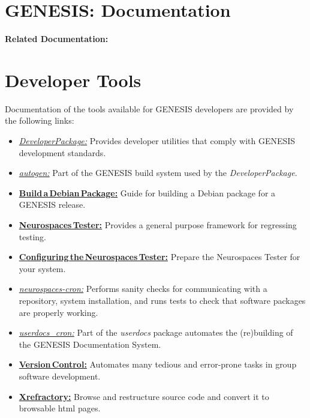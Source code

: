 \documentclass[12pt]{article}
\begin{document}
\section*{GENESIS: Documentation}

{\bf Related Documentation:}

\section*{Developer Tools}

Documentation of the tools available for GENESIS developers are provided by the following links:

\begin{itemize}
   \item[]\href{../developer-package/developer-package.tex}{\it DeveloperPackage:} Provides developer utilities that comply with GENESIS development standards.
   \item[]\href{../autogen/autogen.tex}{\it autogen:} Part of the GENESIS build system used by the {\it DeveloperPackage}.
   \item[]\href{../build-debian/build-debian.tex}{\bf Build\,a\,Debian\,Package:} Guide for building a Debian package for a GENESIS release.
   \item[]\href{../neurospaces-tester/neurospaces-tester.tex}{\bf Neurospaces\,Tester:} Provides a general purpose framework for regressing testing. 
   \item[]\href{../tester-configuration/tester-configuration.tex}{\bf Configuring\,the\,Neurospaces\,Tester:} Prepare the Neurospaces Tester for your system.
   \item[]\href{../neurospaces-cron/neurospaces-cron.tex}{\it neurospaces-cron:} Performs sanity checks for communicating with a repository, system installation, and runs tests to check that software packages are properly working.
   \item[]\href{../userdocs-cron/userdocs-cron.tex}{\it userdocs\_cron:} Part of the {\it userdocs} package automates the (re)building of the GENESIS Documentation System.
   \item[]\href{../version-control/version-control.tex}{\bf Version\,Control:} Automates many tedious and error-prone tasks in group software development.
   \item[]\href{../cxref/cxref.tex}{\bf Xrefractory:} Browse and restructure source code and convert it to browsable html pages. 

\end{itemize}
\end{document}
